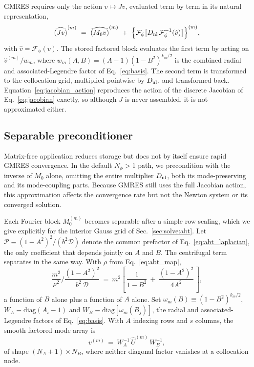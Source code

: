 \documentclass[
  aps,
  prd,
  twocolumn,
  10pt,
  amsmath,
  amssymb,
  nofootinbib,
  superscriptaddress,
  floatfix,
]{revtex4-2}
\begin{document}
GMRES requires only the action $v\mapsto Jv$, evaluated term by term in its
natural representation,
\begin{equation}
  \widehat{(Jv)}^{(m)}
  \ = \
  \widehat{(M_0v)}^{(m)}
  \ + \ \Big\{\mathcal{F}_\phi\big[
      D_{\rm nl}\,\mathcal{F}_\phi^{-1}(\hat v)
    \big]\Big\}^{(m)},
  \label{eq:jacobian_action}
\end{equation}
with $\hat v=\mathcal{F}_\phi(v)$. The stored factored block evaluates the first
term by acting on $\hat v^{(m)}/w_m$, where $w_m(A,B)=(A-1)(1-B^2)^{k_m/2}$ is the
combined radial and associated-Legendre factor of Eq.~\eqref{eq:basis}. The second term is
transformed to the collocation grid, multiplied pointwise by $D_{\rm nl}$, and
transformed back. Equation~\eqref{eq:jacobian_action} reproduces the action of the
discrete Jacobian of Eq.~\eqref{eq:jacobian} exactly, so although $J$ is never assembled,
it is not approximated either.

\subsection{Separable preconditioner}
\label{sec:separable}

Matrix-free application reduces storage but does not by itself ensure rapid GMRES
convergence. In the default $N_\phi>1$ path, we precondition with the inverse of
$M_0$ alone, omitting the entire multiplier $D_{\rm nl}$, both its
mode-preserving and its mode-coupling parts. Because GMRES still uses the full
Jacobian action, this approximation affects the convergence rate but not the
Newton system or its converged solution.

Each Fourier block $M_0^{(m)}$ becomes separable after a simple row scaling, which we give explicitly for the interior Gauss grid of Sec.~\ref{sec:solve:abt}.
Let $\mathcal{P}\equiv(1-A^2)^2/(b^2\mathcal{D})$ denote the common prefactor of Eq.~\eqref{eq:abt_laplacian}, the only coefficient that depends jointly on $A$ and $B$.
The centrifugal term separates in the same way. With $\rho$ from Eq.~\eqref{eq:abt_map},
\begin{equation}
  \frac{m^2}{\rho^2}\bigg/\frac{(1-A^2)^2}{b^2\,\mathcal{D}}
 \ = \ m^2\left[\,\frac{1}{1-B^2} \ + \ \frac{(1-A^2)^2}{4A^2}\,\right],
  \label{eq:centrifugal_split}
\end{equation}
a function of $B$ alone plus a function of $A$ alone.
Set $\omega_m(B)\equiv(1-B^2)^{k_m/2}$, $W_A\equiv\mathrm{diag}(A_i-1)$ and $W_B\equiv\mathrm{diag}[\omega_m(B_j)]$, the radial and associated-Legendre factors of Eq.~\eqref{eq:basis}.
With $A$ indexing rows and $s$ columns, the smooth factored mode array is
\begin{equation}
  v^{(m)} \ = \ W_A^{-1}\,\widehat U^{(m)}\,W_B^{-1},
  \label{eq:smooth_mode}
\end{equation}
of shape $(N_A{+}1)\times N_B$, where neither diagonal factor vanishes at a collocation node.
\end{document}
